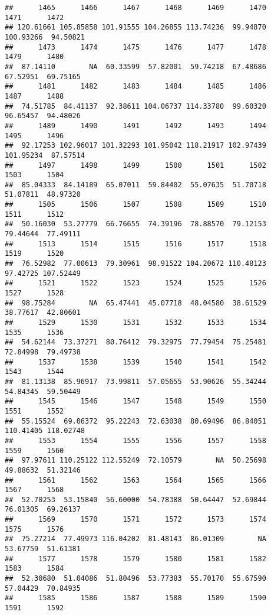 \documentclass[
]{article}
\begin{document}
\begin{verbatim}
##      1465      1466      1467      1468      1469      1470      1471      1472 
## 120.61661 105.85858 101.91555 104.26855 113.74236  99.94870 100.93266  94.50821 
##      1473      1474      1475      1476      1477      1478      1479      1480 
##  87.14110        NA  60.33599  57.82001  59.74218  67.48686  67.52951  69.75165 
##      1481      1482      1483      1484      1485      1486      1487      1488 
##  74.51785  84.41137  92.38611 104.06737 114.33780  99.60320  96.65457  94.48026 
##      1489      1490      1491      1492      1493      1494      1495      1496 
##  92.17253 102.96017 101.32293 101.95042 118.21917 102.97439 101.95234  87.57514 
##      1497      1498      1499      1500      1501      1502      1503      1504 
##  85.04333  84.14189  65.07011  59.84402  55.07635  51.70718  51.07811  48.97320 
##      1505      1506      1507      1508      1509      1510      1511      1512 
##  50.16030  53.27779  66.76655  74.39196  78.88570  79.12153  79.44644  77.49111 
##      1513      1514      1515      1516      1517      1518      1519      1520 
##  76.52982  77.00613  79.30961  98.91522 104.20672 110.48123  97.42725 107.52449 
##      1521      1522      1523      1524      1525      1526      1527      1528 
##  98.75284        NA  65.47441  45.07718  48.04580  38.61529  38.77617  42.80601 
##      1529      1530      1531      1532      1533      1534      1535      1536 
##  54.62144  73.37271  80.76412  79.32975  77.79454  75.25481  72.84998  79.49738 
##      1537      1538      1539      1540      1541      1542      1543      1544 
##  81.13138  85.96917  73.99811  57.05655  53.90626  55.34244  54.84345  59.50449 
##      1545      1546      1547      1548      1549      1550      1551      1552 
##  55.15524  69.06372  95.22243  72.63038  80.69496  86.84051 110.41405 118.02748 
##      1553      1554      1555      1556      1557      1558      1559      1560 
##  97.97611 110.25122 112.55249  72.10579        NA  50.25698  49.88632  51.32146 
##      1561      1562      1563      1564      1565      1566      1567      1568 
##  52.70253  53.15840  56.60000  54.78388  50.64447  52.69844  76.01305  69.26137 
##      1569      1570      1571      1572      1573      1574      1575      1576 
##  75.27214  77.49973 116.04202  81.48143  86.01309        NA  53.67759  51.61381 
##      1577      1578      1579      1580      1581      1582      1583      1584 
##  52.30680  51.04086  51.80496  53.77383  55.70170  55.67590  57.04429  70.84935 
##      1585      1586      1587      1588      1589      1590      1591      1592 

\end{verbatim}
\end{document}
